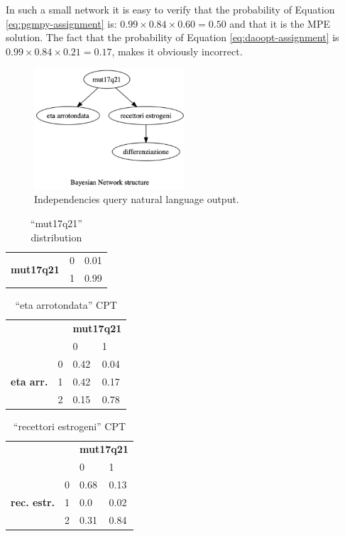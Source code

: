In such a small network it is easy to verify that the probability of Equation \ref{eq:pgmpy-assignment} is: $0.99 \times 0.84 \times 0.60 = 0.50$ and that it is the MPE solution.
The fact that the probability of Equation \ref{eq:daoopt-assignment} is $0.99 \times 0.84 \times 0.21 = 0.17$, makes it obviously incorrect.

\begin{figure}[htbp]
\centerline{\includegraphics[width=0.5\textwidth]{results/images/issues-bn}}
\caption{Independencies query natural language output.}
\label{fig:issues-bn}
\end{figure}

\begin{table}[htbp]
\centering
\caption{\enquote{mut17q21} distribution}
\begin{tabularx}{\textwidth/3}{ccX}
\toprule
 \multirow{2}{*}{\textbf{mut17q21}} & 0 & 0.01  \\
 & 1 & 0.99 \\
\bottomrule
\end{tabularx}
\label{tab:mut-cpd-issues}
\end{table}

\begin{table}[htbp]
\centering
\caption{\enquote{eta arrotondata} CPT}
\begin{tabularx}{0.5\textwidth}{ccXX}
\toprule
      & &  \multicolumn{2}{c}{\textbf{mut17q21}} \\
\cmidrule(lr){3-4}
 & & 0 & 1    \\ 
 \multirow{3}{*}{\textbf{eta arr.}}  & 0 & 0.42 & 0.04  \\
 & 1 & 0.42 & 0.17    \\
 & 2 & 0.15 & 0.78 \\
\bottomrule
\end{tabularx}
\label{tab:eta-cpd-issues}
\end{table}

\begin{table}[htbp]
\centering
\caption{\enquote{recettori estrogeni} CPT}
\begin{tabularx}{0.5\textwidth}{ccXX}
\toprule
      & &  \multicolumn{2}{c}{\textbf{mut17q21}} \\
\cmidrule(lr){3-4}
 & & 0 & 1    \\ 
 \multirow{3}{*}{\textbf{rec. estr.}}  & 0 & 0.68 & 0.13  \\
 & 1 & 0.0 & 0.02    \\
 & 2 & 0.31 & 0.84 \\
\bottomrule
\end{tabularx}
\label{tab:rec-cpd-issues}
\end{table}

